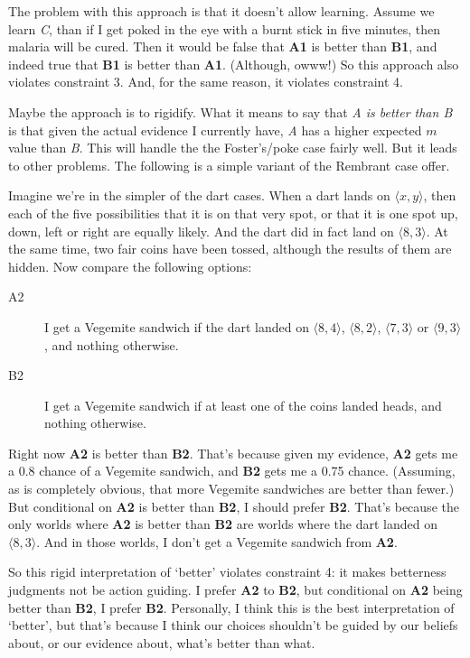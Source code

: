 The problem with this approach is that it doesn't allow learning. Assume we learn \emph{C}, than if I get poked in the eye with a burnt stick in five minutes, then malaria will be cured. Then it would be false that \textbf{A1} is better than \textbf{B1}, and indeed true that \textbf{B1} is better than \textbf{A1}. (Although, owww!) So this approach also violates constraint 3. And, for the same reason, it violates constraint 4.

Maybe the approach is to rigidify. What it means to say that \emph{A is better than B} is that given the actual evidence I currently have, \emph{A} has a higher expected $m$ value than \emph{B}. This will handle the the Foster's\slash poke case fairly well. But it leads to other problems. The following is a simple variant of the Rembrant case \citet[331]{RussellHawthorne2016} offer.

Imagine we're in the simpler of the dart cases. When a dart lands on $\langle x, y \rangle$, then each of the five possibilities that it is on that very spot, or that it is one spot up, down, left or right are equally likely. And the dart did in fact land on $\langle 8, 3 \rangle$. At the same time, two fair coins have been tossed, although the results of them are hidden. Now compare the following options:

\begin{description}
\item[A2]

I get a Vegemite sandwich if the dart landed on $\langle 8, 4 \rangle$, $\langle 8, 2 \rangle$, $\langle 7, 3 \rangle$ or $\langle 9, 3 \rangle$, and nothing otherwise.

\item[B2]

I get a Vegemite sandwich if at least one of the coins landed heads, and nothing otherwise.
\end{description}
Right now \textbf{A2} is better than \textbf{B2}. That's because given my evidence, \textbf{A2} gets me a 0.8 chance of a Vegemite sandwich, and \textbf{B2} gets me a 0.75 chance. (Assuming, as is completely obvious, that more Vegemite sandwiches are better than fewer.) But conditional on \textbf{A2} is better than \textbf{B2}, I should prefer \textbf{B2}. That's because the only worlds where \textbf{A2} is better than \textbf{B2} are worlds where the dart landed on $\langle 8, 3 \rangle$. And in those worlds, I don't get a Vegemite sandwich from \textbf{A2}.

So this rigid interpretation of `better' violates constraint 4: it makes betterness judgments not be action guiding. I prefer \textbf{A2} to \textbf{B2}, but conditional on \textbf{A2} being better than \textbf{B2}, I prefer \textbf{B2}. Personally, I think this is the best interpretation of `better', but that's because I think our choices shouldn't be guided by our beliefs about, or our evidence about, what's better than what.

